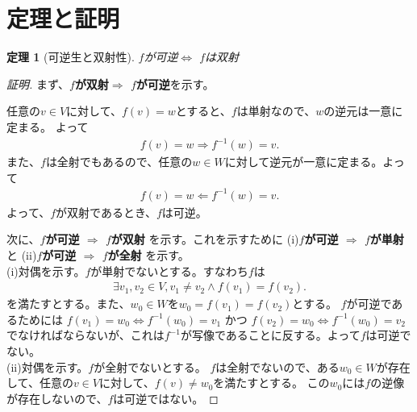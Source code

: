 \documentclass{jsarticle}
\newtheorem{Theorem}{定理}
\begin{document}
\section{定理と証明}
\begin{Theorem}[可逆生と双射性]
    $f$が可逆$\Leftrightarrow$ $f$は双射
\end{Theorem}
\begin{proof}[証明]
    まず、{\bf $f$が双射$\Rightarrow$ $f$が可逆}を示す。
    
    任意の$v\in V$に対して、$f(v)=w$とすると、$f$は単射なので、$w$の逆元は一意に定まる。
    よって
    \begin{align}
        f(v)=w \Rightarrow f^{-1}(w)=v.
    \end{align}
    また、$f$は全射でもあるので、任意の$w \in W$に対して逆元が一意に定まる。よって
    \begin{align}
        f(v)=w \Leftarrow f^{-1}(w)=v.
    \end{align}
    よって、$f$が双射であるとき、$f$は可逆。

    次に、{\bf $f$が可逆 $\Rightarrow$ $f$が双射}
    を示す。これを示すために
    (i){\bf $f$が可逆 $\Rightarrow$ $f$が単射}
    と
    (ii){\bf $f$が可逆 $\Rightarrow$ $f$が全射}
    を示す。\\
    (i)対偶を示す。$f$が単射でないとする。すなわち$f$は
    \begin{align}
        \exists v_1, v_2 \in V, v_1 \neq v_2 \land f(v_1)=f(v_2).
    \end{align}
    を満たすとする。また、$w_0 \in W$を$w_0 = f(v_1)=f(v_2)$とする。
    $f$が可逆であるためには
    $f(v_1)=w_0 \Leftrightarrow f^{-1}(w_0)=v_1$ かつ $f(v_2)=w_0 \Leftrightarrow f^{-1}(w_0)=v_2$
    でなければならないが、これは$f^{-1}$が写像であることに反する。よって$f$は可逆でない。\\
    (ii)対偶を示す。$f$が全射でないとする。
    $f$は全射でないので、ある$w_0 \in W$が存在して、任意の$v \in V$に対して、$f(v) \neq w_0$を満たすとする。
    この$w_0$には$f$の逆像が存在しないので、$f$は可逆ではない。
\end{proof}
\end{document}
